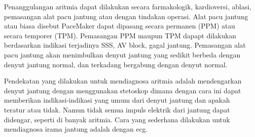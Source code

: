 Penanggulangan aritmia dapat dilakukan secara farmakologik, kardioversi,
ablasi, pemasangan alat pacu jantung atau dengan tindakan operasi. Alat pacu
jantung atau biasa disebut PaceMaker dapat dipasang secara permanen (PPM) atau
secara temporer (TPM). Pemasangan PPM maupun TPM dapapt dilakukan berdasarkan
indikasi terjadinya SSS,  AV block, gagal jantung. Pemasangan alat pacu jantung
akan menimbulkan denyut jantung yang sedikit berbeda dengan denyut jantung
normal, dan terkadang bergabung dengan denyut normal.

 
Pendekatan yang dilakukan untuk mendiagnosa aritmia adalah
mendengarkan denyut jantung dengan menggunakan stetoskop dimana dengan cara ini
dapat memberikan indikasi-indikasi yang umum dari denyut jantung dan apakah
teratur atau tidak. Namun tidak semua impuls elektrik dari jantung dapat
didengar, seperti di banyak aritmia. Cara yang sederhana dilakukan
untuk mendiagnosa irama jantung adalah dengan \gls{ecg}.






